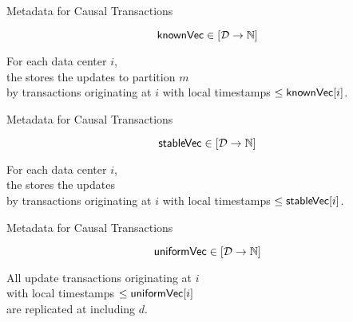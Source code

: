 \begin{frame}{Metadata for Causal Transactions}
  \begin{center}
    \[
      {\sf knownVec} \in [\mathcal{D} \to \mathbb{N}]
    \]

    \begin{property}
      \begin{center}
        For each data center $i$, \\[3pt]
        the  stores the updates to partition $m$ \\[3pt]
        by transactions originating at $i$
        with local timestamps $\le {\sf knownVec}[i]$.
      \end{center}
    \end{property}
  \end{center}
\end{frame}

\begin{frame}{Metadata for Causal Transactions}
  \begin{center}
    \[
      {\sf stableVec} \in [\mathcal{D} \to \mathbb{N}]
    \]

    \begin{property}
      \begin{center}
        For each data center $i$, \\[3pt]
        the  stores the updates \\[3pt]
        by transactions originating at $i$ with local timestamps $\le {\sf stableVec}[i]$.
      \end{center}
    \end{property}
  \end{center}
\end{frame}

\begin{frame}{Metadata for Causal Transactions}
  \begin{center}
    \[
      {\sf uniformVec} \in [\mathcal{D} \to \mathbb{N}]
    \]

    \begin{property}
      \begin{center}
        All update transactions originating at $i$ \\[3pt]
        with local timestamps $\le {\sf uniformVec}[i]$ \\[3pt]
        are replicated at  including $d$.
      \end{center}
    \end{property}
  \end{center}
\end{frame}

